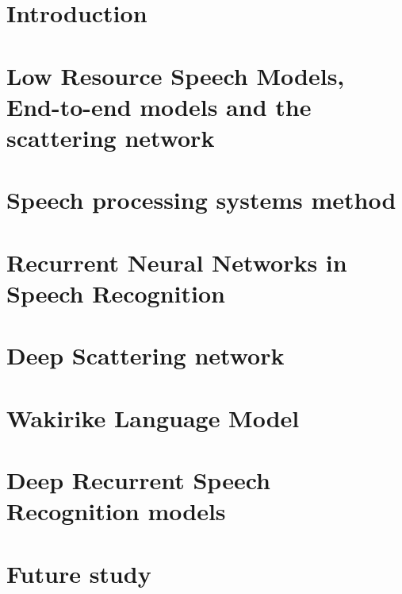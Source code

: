 \documentclass[12pt,twoside]{report}
\begin{document}
\listoffigures
 
\listoftables

\clearpage
 
\printglossary[type=\acronymtype]

\chapter{Introduction}\label{ch1_intro}


\chapter{Low Resource Speech Models, End-to-end models and the scattering network}\label{c02}


\chapter{Speech processing systems method}\label{ch3Method}


\chapter{Recurrent Neural Networks in Speech Recognition}\label{ch3RNN}


\chapter{Deep Scattering network}\label{ch4DSN}


\chapter{Wakirike Language Model}\label{ch6_wlm}


\chapter{Deep Recurrent Speech Recognition models}\label{ch6_speech}


\chapter{Future study}\label{ch8_future}

\end{document}
